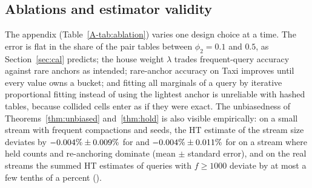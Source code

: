 \subsection{Ablations and estimator validity}\label{sec:ablation}

The appendix (Table~\ref{A-tab:ablation}) varies one design choice at a time. The error is flat in the
share of the pair tables between $\phi_2=0.1$ and $0.5$, as Section~\ref{sec:cal} predicts; the house weight
$\lambda$ trades frequent-query accuracy against rare anchors as intended; rare-anchor accuracy on Taxi
improves until every value owns a bucket; and fitting all marginals of a query by iterative proportional
fitting instead of using the lightest anchor is unreliable with hashed tables, because collided cells
enter as if they were exact. The unbiasedness of Theorems~\ref{thm:unbiased} and~\ref{thm:hold} is also
visible empirically: on a small stream with frequent compactions and \NumProbeSeeds{} seeds, the HT
estimate of the stream size deviates by $-0.004\%\pm0.009\%$ for \cs and
$-0.004\%\pm0.011\%$ for \csh on a stream where held counts and re-anchoring dominate
(mean $\pm$ standard error), and on the real streams the summed HT estimates of queries with $f\ge1000$
deviate by at most a few tenths of a percent ().
